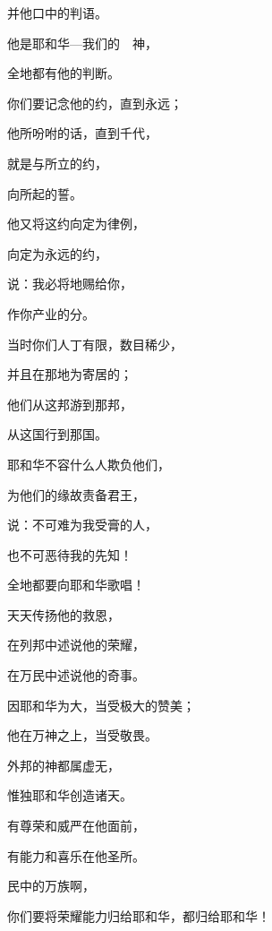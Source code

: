 {\par }{\Q 并他口中的判语。
\par }{\BB \par }{\Q {}他是耶和华—我们的　神，
\par }{\Q 全地都有他的判断。
\par }{\Q {}你们要记念他的约，直到永远；
\par }{\Q 他所吩咐的话，直到千代，
\par }{\Q {}就是与{}所立的约，
\par }{\Q 向{}所起的誓。
\par }{\Q {}他又将这约向{}定为律例，
\par }{\Q 向{}定为永远的约，
\par }{\Q {}说：我必将{}地赐给你，
\par }{\Q 作你产业的分。
\par }{\BB \par }{\Q {}当时你们人丁有限，数目稀少，
\par }{\Q 并且在那地为寄居的；
\par }{\Q {}他们从这邦游到那邦，
\par }{\Q 从这国行到那国。
\par }{\Q {}耶和华不容什么人欺负他们，
\par }{\Q 为他们的缘故责备君王，
\par }{\Q {}说：不可难为我受膏的人，
\par }{\Q 也不可恶待我的先知！
\par }{\BB \par }{\Q {}全地都要向耶和华歌唱！
\par }{\Q 天天传扬他的救恩，
\par }{\Q {}在列邦中述说他的荣耀，
\par }{\Q 在万民中述说他的奇事。
\par }{\Q {}因耶和华为大，当受极大的赞美；
\par }{\Q 他在万神之上，当受敬畏。
\par }{\Q {}外邦的神都属虚无，
\par }{\Q 惟独耶和华创造诸天。
\par }{\Q {}有尊荣和威严在他面前，
\par }{\Q 有能力和喜乐在他圣所。
\par }{\BB \par }{\Q {}民中的万族啊，
\par }{\Q 你们要将荣耀能力归给耶和华，都归给耶和华！
}

